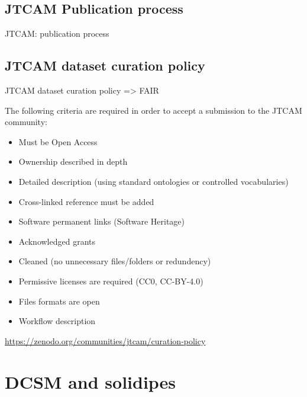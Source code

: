 \documentclass[10pt,compress,serif,aspectratio=169]{beamer}
\begin{document}
\subsection{JTCAM Publication process}
\begin{frame}[t]{JTCAM: publication process}
 \begin{center}%
 \end{center}%
\end{frame}


\subsection{JTCAM dataset curation policy }
\begin{frame}{JTCAM dataset curation policy => FAIR}

The following criteria are required in order to accept a submission to the JTCAM community:

\begin{itemize}
\item Must be Open Access
\item Ownership described in depth
\item Detailed description (using standard ontologies or controlled vocabularies)
\item Cross-linked reference must be added
\item Software permanent links (Software Heritage)
\item Acknowledged grants
\item Cleaned (no unnecessary files/folders or redundency)
\item Permissive licenses are required (CC0, CC-BY-4.0)
\item Files formats are open
\item Workflow description
\end{itemize}

\vfill
  \url{https://zenodo.org/communities/jtcam/curation-policy}

\end{frame}

\section{DCSM and solidipes}
\end{document}

